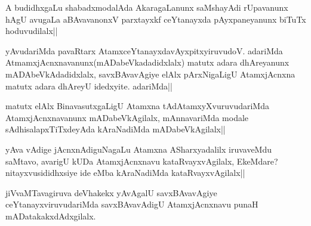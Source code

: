 
\begin{artha}
A budidhxgaLu shabadxmodalAda AkaragaLanunx saMshayAdi rUpavanunx hAgU avugaLa aBAvavanonxV parxtayxkf ceYtanayxda pAyxpaneyanunx biTuTx hoduvudilalx||
\end{artha}


\begin{artha}
yAvudariMda pavaRtarx AtamxceYtanayxdavAyxpitxyiruvudoV. adariMda AtmamxjAcnxnavanunx(mADabeVkadadidxlalx) matutx adara dhAreyanunx mADAbeVkAdadidxlalx, savxBAvavAgiye elAlx pArxNigaLigU AtamxjAcnxna matutx adara dhAreyU idedxyite. adariMda||
\end{artha}

\begin{artha}
matutx elAlx BinavasutxgaLigU Atamxna tAdAtamxyXvuruvudariMda AtamxjAcnxnavanunx mADabeVkAgilalx, mAnnavariMda modale sAdhisalapxTiTxdeyAda kAraNadiMda mADabeVkAgilalx||
\end{artha}


\begin{artha}
yAva vAdige jAcnxnAdiguNagaLu Atamxna ASharxyadalilx iruvaveMdu saMtavo, avarigU kUDa AtamxjAcnxnavu kataRvayxvAgilalx, EkeMdare? nitayxvusididhxsiye ide eMba kAraNadiMda kataRvayxvAgilalx||
\end{artha}


\begin{artha}
jiVvaMTavagiruva deVhakekx yAvAgalU savxBAvavAgiye ceYtanayxviruvudariMda savxBAvavAdigU AtamxjAcnxnavu punaH mADatakakxdAdxgilalx.
\end{artha}


